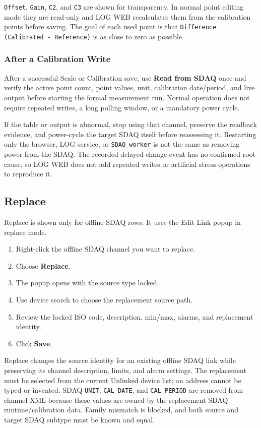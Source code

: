 \documentclass[11pt,a4paper]{article}
\begin{document}
\texttt{Offset}, \texttt{Gain}, \texttt{C2}, and \texttt{C3} are shown for transparency. In normal point editing mode they are read-only and LOG WEB recalculates them from the calibration points before saving. The goal of each used point is that \texttt{Difference (Calibrated - Reference)} is as close to zero as possible.

\subsubsection{After a Calibration Write}
After a successful Scale or Calibration save, use \textbf{Read from SDAQ} once and verify the active point count, point values, unit, calibration date/period, and live output before starting the formal measurement run. Normal operation does not require repeated writes, a long polling window, or a mandatory power cycle.

If the table or output is abnormal, stop using that channel, preserve the readback evidence, and power-cycle the target SDAQ itself before reassessing it. Restarting only the browser, LOG service, or \texttt{SDAQ\_worker} is not the same as removing power from the SDAQ. The recorded delayed-change event has no confirmed root cause, so LOG WEB does not add repeated writes or artificial stress operations to reproduce it.

\subsection{Replace}
Replace is shown only for offline SDAQ rows. It uses the Edit Link popup in replace mode.

\begin{enumerate}
\item Right-click the offline SDAQ channel you want to replace.
\item Choose \textbf{Replace}.
\item The popup opens with the source type locked.
\item Use device search to choose the replacement source path.
\item Review the locked ISO code, description, min/max, alarms, and replacement identity.
\item Click \textbf{Save}.
\end{enumerate}

Replace changes the source identity for an existing offline SDAQ link while preserving its channel description, limits, and alarm settings. The replacement must be selected from the current Unlinked device list; an address cannot be typed or invented. SDAQ \texttt{UNIT}, \texttt{CAL\_DATE}, and \texttt{CAL\_PERIOD} are removed from channel XML because these values are owned by the replacement SDAQ runtime/calibration data. Family mismatch is blocked, and both source and target SDAQ subtype must be known and equal.
\end{document}
